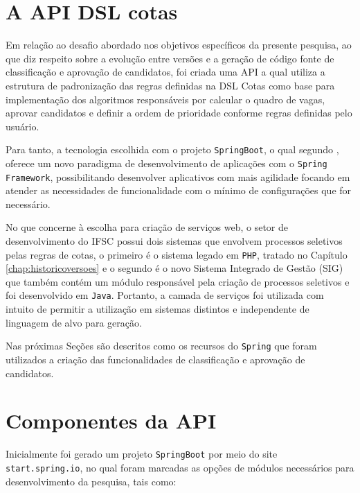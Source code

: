 \section{A API DSL cotas}
\label{apicotas}

Em relação ao desafio abordado nos objetivos específicos da presente pesquisa, ao que diz respeito sobre a evolução entre versões e a geração de código fonte de classificação e aprovação de candidatos, foi criada uma \gls{API} a qual utiliza a estrutura de padronização das regras definidas na DSL Cotas como base para implementação dos algoritmos responsáveis por calcular o quadro de vagas, aprovar candidatos e definir a ordem de prioridade conforme regras definidas pelo usuário.


Para tanto, a tecnologia escolhida com o projeto \texttt{SpringBoot}, o qual segundo , oferece um novo paradigma de desenvolvimento de aplicações com o \texttt{Spring Framework}, possibilitando desenvolver aplicativos com mais agilidade focando em atender as necessidades de funcionalidade com o mínimo de configurações que for necessário.

No que concerne à escolha para criação de serviços web, o setor de desenvolvimento do \gls{IFSC} possui dois sistemas que envolvem processos seletivos pelas regras de cotas, o primeiro é o sistema legado em \texttt{PHP}, tratado no Capítulo \ref{chap:historicoversoes} e o segundo é o novo Sistema Integrado de Gestão (SIG) que também contém um módulo responsável pela criação de processos seletivos e foi desenvolvido em \texttt{Java}. Portanto, a camada de serviços foi utilizada com intuito de permitir a utilização em sistemas distintos e independente de linguagem de alvo para geração.


Nas próximas Seções são descritos como os recursos do \texttt{Spring} que foram utilizados a criação das funcionalidades de classificação e aprovação de candidatos.


\section{Componentes da API}
\label{componentesapi}

Inicialmente foi gerado um projeto \texttt{SpringBoot} por meio do site \texttt{start.spring.io}, no qual foram marcadas as opções de módulos necessários para desenvolvimento da pesquisa, tais como:



